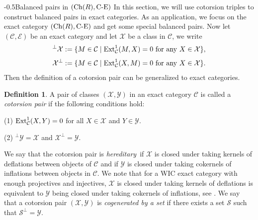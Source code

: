 \documentclass[reqno,12pt]{amsart}
\makeatletter
\numberwithin{equation}{section}
\def\Ext{\mbox{\rm Ext}} \def\Tor{\mbox{\rm Tor}}\def\Hom{\mbox{\rm Hom}} \def\dim{\mbox{\rm dim}} \def\Iso{\mbox{\rm Iso}}
\def\dim{\mbox{\rm dim}}\def\Irr{\mbox{\rm Irr}}\def\rad{\mbox{\rm rad}}\def\fg{\mbox{\rm fg}}
\def\Ch{\mbox{\rm Ch}}
\theoremstyle{plain}
\theoremstyle{definition}
\newtheorem{definition}[theorem]{\bf Definition}
\newcommand{\CE}{\mathrm{C}\text{-}\mathrm{E}}
\renewcommand{\section}{\@startsection{section}{1}{0mm}
  {-\baselineskip}{0.5\baselineskip}{\bf\leftline}}
\makeatother
\begin{document}
\section{Balanced pairs in $(\Ch(R),\CE)$}
In this section, we will use cotorsion triples to construct balanced pairs in exact
categories. As an application, we focus on the exact category $(\Ch(R),\text{C-E})$ and get
some special balanced pairs. Now let $(\mathcal{C}, \mathcal{E})$ be an exact category and let
$\mathcal{X}$ be a class in $\mathcal{C}$, we write
$$^{\bot}\mathcal{X}:=\{M\in\mathcal{C}\mid\Ext_{\mathcal{C}}^1(M,X)=0\ \text{for\ any}\ X\in\mathcal{X}\},$$
$$\mathcal{X}^{\bot}:=\{M\in\mathcal{C}\mid\Ext_{\mathcal{C}}^1(X,M)=0\ \text{for\ any}\ X\in\mathcal{X}\}.$$
Then the definition of a cotorsion pair can be generalized to exact categories.

\begin{definition}\cite[Definition 2.1]{G11}
    A pair of classes $(\mathcal{X},\mathcal{Y})$ in an exact category $\mathcal{C}$ is
    called a {\it cotorsion pair} if the following conditions hold:

    {\rm (1)} $\Ext^1_{\mathcal{C}}(X,Y)=0$ for all $X\in\mathcal{X}$ and $Y\in\mathcal{Y}$.

    {\rm (2)} $^{\perp}\mathcal{Y}=\mathcal{X}$ and $\mathcal{X}^{\perp}=\mathcal{Y}$.
\end{definition}
We say that the cotorsion pair is {\it hereditary}\, \cite{G11} if $\mathcal{X}$
is closed under taking kernels of deflations between objects of $\mathcal{C}$
and if $\mathcal{Y}$ is closed under taking cokernels of inflations between
objects in $\mathcal{C}$. We note that for a WIC exact category with enough
projectives and injectives, $\mathcal{X}$ is closed under taking kernels of
deflations is equivalent to $\mathcal{Y}$ being closed under taking cokernels of
inflations, see \cite[Lemma 6.17]{S13}. We say that a cotorsion pair $(\mathcal{X},\mathcal{Y})$ is {\it cogenerated by a set} if there exists a set $\mathcal{S}$ such that $\mathcal{S}^{\perp}=\mathcal{Y}$.
\end{document}
